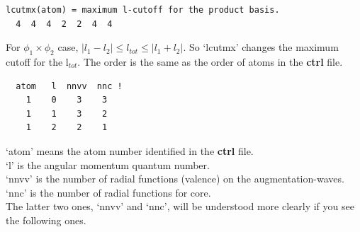 {\begin{enumerate}
\begin{verbatim}
lcutmx(atom) = maximum l-cutoff for the product basis.
  4  4  4  2  2  4  4
\end{verbatim}
For $\phi_1 \times \phi_2$ case, $|l_1 - l_2| \le l_{tot} \le |l_1 + l_2|$. So `lcutmx' changes the maximum cutoff for the l$_{tot}$. The order is the same as the order of atoms in the {\bf ctrl} file.

\begin{verbatim}
  atom   l  nnvv  nnc !
    1    0    3    3
    1    1    3    2
    1    2    2    1
\end{verbatim}
`atom' means the atom number identified in the {\bf ctrl} file.\\ 
`l' is the angular momentum quantum number.\\
`nnvv' is the number of radial functions (valence) on the augmentation-waves.\\
`nnc' is the number of radial functions for core.\\
The latter two ones, `nnvv' and `nnc', will be understood more clearly if you see the following ones.



\end{enumerate}}
